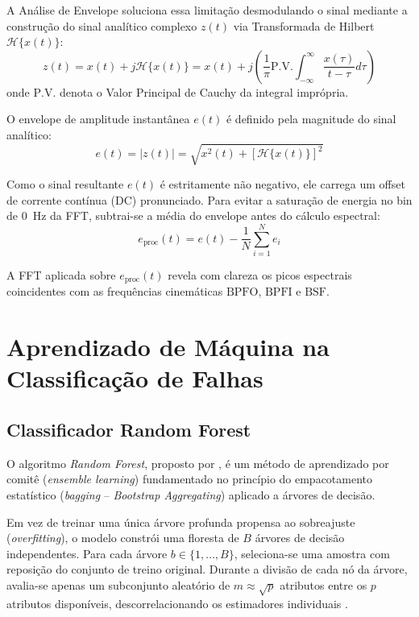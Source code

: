 A Análise de Envelope soluciona essa limitação desmodulando o sinal mediante a construção do sinal analítico complexo $z(t)$ via Transformada de Hilbert $\mathcal{H}\{x(t)\}$:
\begin{equation}
    z(t) = x(t) + j \mathcal{H}\{x(t)\} = x(t) + j \left( \frac{1}{\pi} \text{P.V.} \int_{-\infty}^{\infty} \frac{x(\tau)}{t - \tau} d\tau \right)
    \label{eq:hilbert}
\end{equation}
onde $\text{P.V.}$ denota o Valor Principal de Cauchy da integral imprópria.

O envelope de amplitude instantânea $e(t)$ é definido pela magnitude do sinal analítico:
\begin{equation}
    e(t) = |z(t)| = \sqrt{x^2(t) + [\mathcal{H}\{x(t)\}]^2}
    \label{eq:envelope}
\end{equation}

Como o sinal resultante $e(t)$ é estritamente não negativo, ele carrega um offset de corrente contínua (DC) pronunciado. Para evitar a saturação de energia no bin de \SI{0}{\hertz} da FFT, subtrai-se a média do envelope antes do cálculo espectral:
\begin{equation}
    e_{\text{proc}}(t) = e(t) - \frac{1}{N}\sum_{i=1}^{N} e_i
    \label{eq:envelope_sem_dc}
\end{equation}

A FFT aplicada sobre $e_{\text{proc}}(t)$ revela com clareza os picos espectrais coincidentes com as frequências cinemáticas $\text{BPFO}$, $\text{BPFI}$ e $\text{BSF}$.

\section{Aprendizado de Máquina na Classificação de Falhas}
\label{sec:machine_learning}

\subsection{Classificador Random Forest}
\label{subsec:random_forest}

O algoritmo \textit{Random Forest}, proposto por , é um método de aprendizado por comitê (\textit{ensemble learning}) fundamentado no princípio do empacotamento estatístico (\textit{bagging} -- \textit{Bootstrap Aggregating}) aplicado a árvores de decisão. 

Em vez de treinar uma única árvore profunda propensa ao sobreajuste (\textit{overfitting}), o modelo constrói uma floresta de $B$ árvores de decisão independentes. Para cada árvore $b \in \{1, \dots, B\}$, seleciona-se uma amostra com reposição do conjunto de treino original. Durante a divisão de cada nó da árvore, avalia-se apenas um subconjunto aleatório de $m \approx \sqrt{p}$ atributos entre os $p$ atributos disponíveis, descorrelacionando os estimadores individuais \cite{breiman2001random}.

